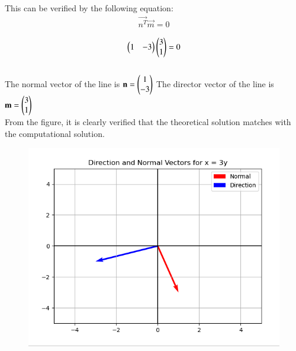 \documentclass[journal]{IEEEtran}
\begin{document}
This can be verified by the following equation:
\begin{align}
\vec{n^T}\vec{m} = 0
\end{align}

\begin{align}
\begin{pmatrix}1 & -3\end{pmatrix}\begin{pmatrix}3 \\ 1\end{pmatrix} = 0
\end{align}\\



The normal vector of the line is $\mathbf{n} = \begin{pmatrix}1 \\ -3\end{pmatrix}$
The director vector of the line is $\mathbf{m} = \begin{pmatrix}3 \\ 1\end{pmatrix}$\\

From the figure, it is clearly verified that the theoretical solution matches with the computational solution.\\
\begin{figure}[h!]
    \centering
    \includegraphics[height=0.5\textheight, keepaspectratio]{figs/fig.png}
    \label{figure_1}
\end{figure}
\end{document}
